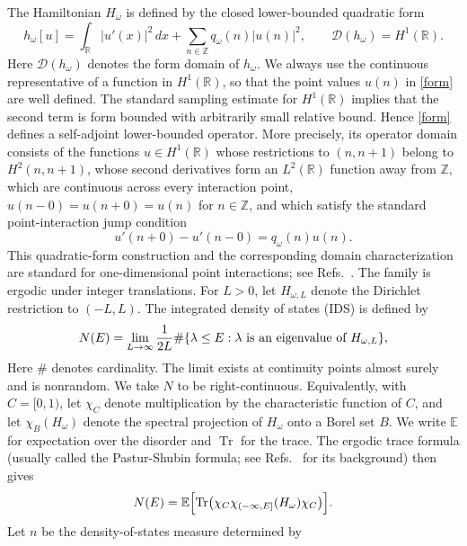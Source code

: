 \documentclass[12pt,a4paper]{article}
\numberwithin{equation}{section}
\newcommand{\refcite}[1]{\cite{#1}}
\newcommand{\Tr}{\operatorname{Tr}}
\newcommand{\E}{\mathbb E}
\newcommand{\R}{\mathbb R}
\newcommand{\Z}{\mathbb Z}
\newcommand{\cD}{\mathcal D}
\begin{document}
The Hamiltonian $H_\omega$ is defined by
the closed lower-bounded quadratic form
\begin{equation}
h_\omega[u]
 =\int_\R |u'(x)|^2\,d x
  +\sum_{n\in\Z}q_\omega(n)|u(n)|^2,
\qquad
\cD(h_\omega)=H^1(\R).
\label{form}
\end{equation}
Here $\cD(h_\omega)$ denotes the form domain of $h_\omega$.  We always use
the continuous representative of a function in $H^1(\R)$, so that the point
values $u(n)$ in \eqref{form} are well defined.  The standard sampling estimate
for $H^1(\R)$ implies that the second term is form bounded with arbitrarily
small relative bound.  Hence \eqref{form} defines a self-adjoint lower-bounded
operator.  More precisely, its operator domain consists of the functions
$u\in H^1(\R)$ whose restrictions to $(n,n+1)$ belong to $H^2(n,n+1)$, whose
second derivatives form an $L^2(\R)$ function away from $\Z$, which are
continuous across every interaction point,
$u(n-0)=u(n+0)=u(n)$ for $n\in\Z$, and which satisfy the standard
point-interaction jump condition
\begin{equation}
u'(n+0)-u'(n-0)=q_\omega(n)u(n).
\label{jump}
\end{equation}
This quadratic-form construction and the corresponding domain
characterization are standard for one-dimensional point interactions;
see Refs.~\refcite{AlbeverioEtAl1984,Albeverio2005}.
The family is ergodic under integer translations.  For $L>0$, let
$H_{\omega,L}$ denote the Dirichlet restriction to $(-L,L)$.  The integrated
density of states (IDS) is defined by
\begin{equation}
N(E)=\lim_{L\to\infty}\frac{1}{2L}
\#\{\lambda\le E:\lambda\hbox{ is an eigenvalue of }H_{\omega,L}\},
\label{IDSdef}
\end{equation}
Here $\#$ denotes cardinality.  The limit exists at continuity points almost surely and is
nonrandom.  We take $N$ to be right-continuous.  Equivalently, with
$C=[0,1)$, let $\chi_C$ denote multiplication by the characteristic function
of $C$, and let $\chi_B(H_\omega)$ denote the spectral projection of
$H_\omega$ onto a Borel set $B$.  We write $\E$ for expectation over the
disorder and $\Tr$ for the trace.  The ergodic trace formula (usually called
the Pastur-Shubin formula; see Refs.~\refcite{Pastur1980,Shubin1979} for its background)
then gives
\begin{equation}
N(E)=\E\Bigl[\Tr\bigl(\chi_C\chi_{(-\infty,E]}(H_\omega)\chi_C\bigr)\Bigr].
\label{PS}
\end{equation}
Let $n$ be the density-of-states measure determined by
\end{document}

